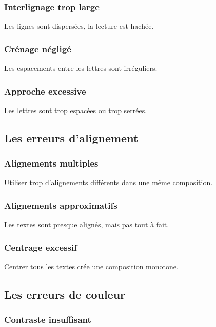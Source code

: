 \subsubsection{Interlignage trop large}

Les lignes sont dispersées, la lecture est hachée.

\subsubsection{Crénage négligé}

Les espacements entre les lettres sont irréguliers.

\subsubsection{Approche excessive}

Les lettres sont trop espacées ou trop serrées.

\subsection{Les erreurs d'alignement}

\subsubsection{Alignements multiples}

Utiliser trop d'alignements différents dans une même composition.

\subsubsection{Alignements approximatifs}

Les textes sont presque alignés, mais pas tout à fait.

\subsubsection{Centrage excessif}

Centrer tous les textes crée une composition monotone.

\subsection{Les erreurs de couleur}

\subsubsection{Contraste insuffisant}

